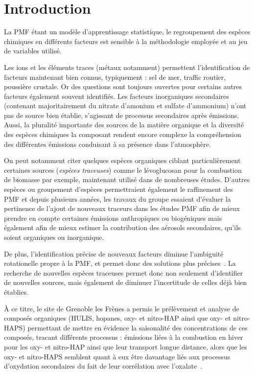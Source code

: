 
\section{Introduction}%
\label{sec:introduction}

La PMF étant un modèle d'apprentissage statistique, le regroupement des espèces chimiques
en différents facteurs est sensible à la méthodologie employée et au jeu de variables
utilisé.

Les ions et les éléments traces (métaux notamment) permettent l'identification de
facteurs
maintenant bien connus, typiquement : sel de mer, traffic routier, poussière crustale.
Or des questions sont toujours ouvertes pour certains autres facteurs également souvent
identifiés. Les facteurs inorganiques secondaires (contenant majoritairement du nitrate d'amonium et sulfate
d'ammonium) n'ont pas de source bien établie, s'agissant de processus secondaires après
émissions.
Aussi, la pluralité importante des sources de la matière organique et la diversité des
espèces chimiques la composant rendent encore complexe la compréhension des différentes
émissions conduisant à sa présence dans l'atmosphère.

On peut notamment citer quelques espèces organiques ciblant particulièrement certaines sources
(\textit{espèces traceuses}) comme le lévoglucosan pour la combustion de biomasse par
exemple, maintenant utilisé dans de nombreuses études.
D'autres espèces ou groupement d'espèces permettraient également le raffinement des PMF
et depuis plusieurs années, les travaux du groupe essaient d'évaluer la pertinence de
l'ajout de nouveaux traceurs dans les études PMF afin de mieux prendre en compte
certaines émissions anthropiques ou biogéniques mais également afin de mieux estimer la
contribution des aérosols secondaires, qu'ils soient organiques ou inorganique.

De plus, l'identification précise de nouveaux facteurs diminue l'ambiguité rotationelle
propre à la PMF, et permet donc des solutions plus précises~\autocite{emamiEffect2017}.
La recherche de nouvelles espèces traceuses permet donc non seulement d'identifier de
nouvelles sources, mais également de diminuer l'incertitude de celles déjà bien établies.

À ce titre, le site de Grenoble les Frènes a permis le prélèvement et analyse de composés
organiques (HULIS, hopanes, oxy- et nitro-HAP ainsi que oxy- et nitro-HAPS) permettant de
mettre en évidence la saisonalité des concentrations de ces composés, tracant différents processus : émissions
liées à la combustion en hiver pour les oxy- et nitro-HAP ainsi que leur transport longue
distance, alors que les oxy- et nitro-HAPS semblent quant à eux être davantage liés aux
processus d'oxydation secondaires du fait de leur corrélation avec
l'oxalate~\autocite{tomazSources2017a}.

